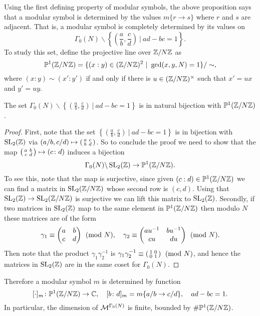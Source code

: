 Using the first defining property of modular symbols, the above proposition says that a modular symbol is determined by the values $m\{r\to s\}$ where $r$ and $s$ are adjacent. That is, a modular symbol is completely determined by its values on
\[
\Gamma_0(N)\backslash \left\{\left(\frac ab,\frac cd\right) ~|~ ad-bc = 1\right\}.
\]
To study this set, define the projective line over $\mathbb{Z}/N\mathbb{Z}$ as
\[
\mathbb{P}^1(\mathbb{Z}/N\mathbb{Z}) = \{(x:y)\in (\mathbb{Z}/N\mathbb{Z})^2 ~|~ \gcd(x,y,N)=1\}/\sim,
\]
where $(x:y)\sim (x':y')$ if and only if there is $u\in(\mathbb{Z}/N\mathbb{Z})^\times$ such that $x'=ux$ and $y'=uy$.
\begin{lemma}
  The set $\Gamma_0(N)\backslash \left\{\left(\frac ab,\frac cd\right) ~|~ ad-bc = 1\right\}$ is in natural bijection with $\mathbb{P}^1(\mathbb{Z}/N\mathbb{Z})$.
\end{lemma}
\begin{proof}
First, note that the set $\left\{\left(\frac ab,\frac cd\right) ~|~ ad-bc = 1\right\}$ is in bijection with $\operatorname{SL}_2(\mathbb{Z})$ via $(a/b,c/d)\mapsto \left(\begin{smallmatrix}a&c\\b&d\end{smallmatrix}\right)$. So to conclude the proof we need to show that the map $\left(\begin{smallmatrix}a&b\\c&d\end{smallmatrix}\right)\mapsto (c\colon d)$ induces a bijection
\[
\Gamma_0(N)\backslash \operatorname{SL}_2(\mathbb{Z})\to \mathbb{P}^1(\mathbb{Z}/N\mathbb{Z}).
\]
To see this, note that the map is surjective, since given $(c:d)\in \mathbb{P}^1(\mathbb{Z}/N\mathbb{Z})$ we can find a matrix in $\operatorname{SL}_2(\mathbb{Z}/N\mathbb{Z})$ whose second row is $(c,d)$. Using that $\operatorname{SL}_2(\mathbb{Z})\to \operatorname{SL}_2(\mathbb{Z}/N\mathbb{Z})$ is surjective we can lift this matrix to $\operatorname{SL}_2(\mathbb{Z})$. Secondly, if two matrices in $\operatorname{SL}_2(\mathbb{Z})$ map to the same element in $\mathbb{P}^1(\mathbb{Z}/N\mathbb{Z})$ then modulo $N$ these matrices are of the form
\[
\gamma_1\equiv \left(\begin{matrix}a&b\\c&d\end{matrix}\right)\pmod{N},\quad \gamma_2 \equiv \left(\begin{matrix}au^{-1}&bu^{-1}\\cu&du\end{matrix}\right)\pmod{N}.
\]
Then note that the product $\gamma_1\gamma_2^{-1}$ is $\gamma_1\gamma_2^{-1} \equiv \left(\begin{smallmatrix}1&0\\0&1\end{smallmatrix}\right)\pmod{N}$,
and hence the matrices in $\operatorname{SL}_2(\mathbb{Z})$ are in the same coset for $\Gamma_0(N)$.
\end{proof}

Therefore a modular symbol $m$ is determined by function
\[
[\cdot]_m\colon \mathbb{P}^1(\mathbb{Z}/N\mathbb{Z})\to\mathbb{C},\quad [b\colon d]_m =m\{a/b\to c/d\},\quad ad-bc = 1.
\]
In particular, the dimension of $\mathcal{M}^{\Gamma_0(N)}$ is finite, bounded by $\#\mathbb{P}^1(\mathbb{Z}/N\mathbb{Z})$.

